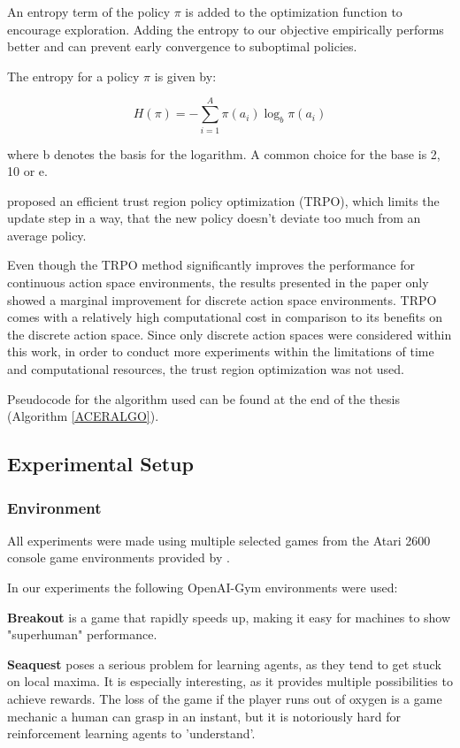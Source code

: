 An entropy term of the policy $\pi$ is added to the optimization function to encourage exploration. 
Adding the entropy to our objective empirically performs better and can prevent early convergence to suboptimal policies.

The entropy for a policy $\pi$ is given by:

\begin{equation}
H(\pi) = -\sum^A_{i=1} \pi(a_i)\log_b \pi(a_i)
\end{equation}

where b denotes the basis for the logarithm. A common choice for the base is 2, 10 or e. \citep{entropy}

\citet{ACER} proposed an efficient trust region policy optimization (TRPO), which limits the update step in a way, that the new policy doesn't deviate too much from an average policy. 

Even though the TRPO method significantly improves the performance for continuous action space environments, the results presented in the paper only showed a marginal improvement for discrete action space environments.
TRPO comes with a relatively high computational cost in comparison to its benefits on the discrete action space.
Since only discrete action spaces were considered within this work, in order to conduct more experiments within the limitations of time and computational resources, the trust region optimization was not used.

Pseudocode for the algorithm used can be found at the end of the thesis (Algorithm \ref{ACERALGO}).

\subsection{Experimental Setup}

\subsubsection{Environment}
All experiments were made using multiple selected games from the Atari 2600 console game environments provided by \citet{openaigym}.

In our experiments the following OpenAI-Gym environments were used:

\textbf{Breakout} is a game that rapidly speeds up, making it easy for machines to show "superhuman" performance.

\textbf{Seaquest} poses a serious problem for learning agents, as they tend to get stuck on local maxima. It is especially interesting, as it provides multiple possibilities to achieve rewards.
The loss of the game if the player runs out of oxygen is a game mechanic a human can grasp in an instant, but it is notoriously hard for reinforcement learning agents to 'understand'.


